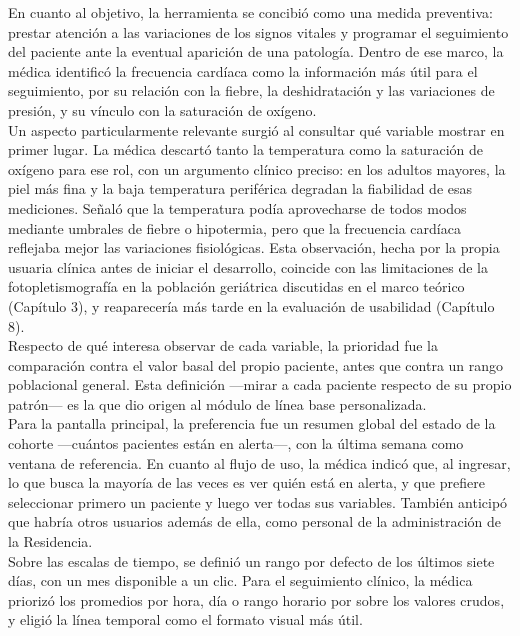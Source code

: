En cuanto al objetivo, la herramienta se concibió como una medida preventiva: prestar atención a las variaciones de los signos vitales y programar el seguimiento del paciente ante la eventual aparición de una patología. Dentro de ese marco, la médica identificó la frecuencia cardíaca como la información más útil para el seguimiento, por su relación con la fiebre, la deshidratación y las variaciones de presión, y su vínculo con la saturación de oxígeno.\\

Un aspecto particularmente relevante surgió al consultar qué variable mostrar en primer lugar. La médica descartó tanto la temperatura como la saturación de oxígeno para ese rol, con un argumento clínico preciso: en los adultos mayores, la piel más fina y la baja temperatura periférica degradan la fiabilidad de esas mediciones. Señaló que la temperatura podía aprovecharse de todos modos mediante umbrales de fiebre o hipotermia, pero que la frecuencia cardíaca reflejaba mejor las variaciones fisiológicas. Esta observación, hecha por la propia usuaria clínica antes de iniciar el desarrollo, coincide con las limitaciones de la fotopletismografía en la población geriátrica discutidas en el marco teórico (Capítulo 3), y reaparecería más tarde en la evaluación de usabilidad (Capítulo 8).\\

Respecto de qué interesa observar de cada variable, la prioridad fue la comparación contra el valor basal del propio paciente, antes que contra un rango poblacional general. Esta definición —mirar a cada paciente respecto de su propio patrón— es la que dio origen al módulo de línea base personalizada.\\

Para la pantalla principal, la preferencia fue un resumen global del estado de la cohorte —cuántos pacientes están en alerta—, con la última semana como ventana de referencia. En cuanto al flujo de uso, la médica indicó que, al ingresar, lo que busca la mayoría de las veces es ver quién está en alerta, y que prefiere seleccionar primero un paciente y luego ver todas sus variables. También anticipó que habría otros usuarios además de ella, como personal de la administración de la Residencia.\\

Sobre las escalas de tiempo, se definió un rango por defecto de los últimos siete días, con un mes disponible a un clic. Para el seguimiento clínico, la médica priorizó los promedios por hora, día o rango horario por sobre los valores crudos, y eligió la línea temporal como el formato visual más útil.\\

